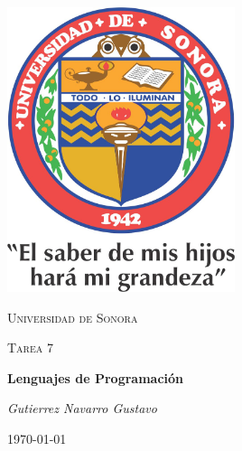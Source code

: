 \documentclass{article}
\begin{document}
\begin{titlepage}
	\centering
	\includegraphics[width=0.5\textwidth]{unisonlogo.jpg}\par\vspace{1cm}
	{\scshape\LARGE Universidad de Sonora\par}
	\vspace{1cm}
	{\scshape\Large Tarea 7\par}
	\vspace{1.5cm}
	{\huge\bfseries Lenguajes de Programación\par}
	\vspace{2cm}
	{\Large\itshape Gutierrez Navarro Gustavo\par}
	\vfill
	\vfill
	{\large \today\par}
\end{titlepage}
\end{document}
